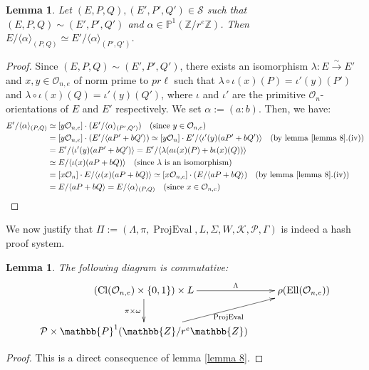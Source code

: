 \documentclass[a4paper,10pt]{report}
\theoremstyle{definition}
\theoremstyle{plain}
\newtheorem{lemma}[definition]{Lemma}
\theoremstyle{definition}
\newcommand{\Z}{\mathbb{Z}}
\newcommand{\m}[1]{\mathcal{#1}}
\newcommand{\mO}{\mathcal{O}}
\renewcommand{\(}{\left(}
\renewcommand{\)}{\right)}
\renewcommand{\P}{\mathbb{P}}
\DeclareMathOperator{\Cl}{Cl}
\DeclareMathOperator{\Ell}{Ell}
\DeclareMathOperator{\ProjEval}{ProjEval}
\begin{document}
\begin{lemma}\label{lemma 9}
Let $(E,P,Q), (E',P',Q')\in \m{S}$ such that $(E,P,Q)\sim (E',P',Q')$ and $\alpha\in\P^1(\Z/r^e\Z)$.  Then $E/\langle\alpha\rangle_{(P,Q)}\simeq E'/\langle\alpha\rangle_{(P',Q')}$.
\end{lemma}

\begin{proof}
Since $(E,P,Q)\sim (E',P',Q')$, there exists an isomorphism $\lambda:E\overset{\sim}{\longrightarrow} E'$ and $x, y\in\mO_{n,e}$ of norm prime to $pr\ell$ such that $\lambda\circ\iota(x)(P)=\iota'(y)(P')$ and $\lambda\circ\iota(x)(Q)=\iota'(y)(Q')$, where $\iota$ and $\iota'$ are the primitive $\mO_n$-orientations of $E$ and $E'$ respectively.  We set $\alpha:=(a:b)$. Then, we have:
\begin{align*}
E'/\langle\alpha\rangle_{(P,Q)}&\simeq [y\mO_{n,e}]\cdot(E'/\langle\alpha\rangle_{(P',Q')}) \quad (\mbox{since } y\in\mO_{n,e})\\
&=[y\mO_{n,e}]\cdot(E'/\langle aP'+bQ' \rangle)\simeq [y\mO_n]\cdot E'/\langle \iota'(y)(aP'+bQ')\rangle \quad (\mbox{by lemma \ref{lemma 8}.(iv)})\\
&= E'/\langle \iota'(y)(aP'+bQ')\rangle=E'/\langle \lambda(a\iota(x)(P)+b\iota(x)(Q))\rangle \\
&\simeq E/\langle \iota(x)(aP+bQ)\rangle\quad (\mbox{since } \lambda \mbox{ is an isomorphism})\\
&=[x\mO_n]\cdot E/\langle \iota(x)(aP+bQ)\rangle\simeq [x\mO_{n,e}]\cdot (E/\langle aP+bQ \rangle) \quad (\mbox{by lemma \ref{lemma 8}.(iv)})\\
&=E/\langle aP+bQ \rangle=E/\langle\alpha\rangle_{(P,Q)} \quad (\mbox{since } x\in\mO_{n,e})
\end{align*}
\end{proof}

We now justify that $\Pi:=(\Lambda,\pi,\ProjEval,L,\Sigma,W,\m{K},\m{P},\Gamma)$ is indeed a hash proof system.

\begin{lemma}
The following diagram is commutative:
\[\xymatrix{
(\Cl(\mO_{n,e})\times\{0,1\})\times L  \ar[r]^-{\Lambda} \ar[d]_{\pi\times\omega} & \rho(\Ell(\mO_{n,e}))\\
\m{P}\times \P^1(\Z/r^e\Z) \ar[ru]_{\ProjEval} &
}\]
\end{lemma}

\begin{proof}
This is a direct consequence of lemma \ref{lemma 8}.
\end{proof}
\end{document}
